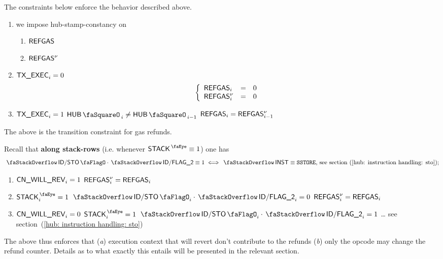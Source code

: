 The constraints below enforce the behavior described above.
\begin{enumerate}
        \item we impose hub-stamp-constancy on
		\begin{multicols}{2}
			\begin{enumerate}
				\item $\textsf{REFGAS}$
				\item $\textsf{REFGAS}^{\nu}$
			\end{enumerate}
		\end{multicols}
	\item \If $\textsf{TX}\textsf{\_EXEC}_{i} = 0$ \Then
		\[
			\left\{ \begin{array}{lcl}
				\textsf{REFGAS}_{i}     & = & 0 \\
				\textsf{REFGAS}^{\nu}_{i} & = & 0 \\
			\end{array} \right.
		\]
	\item \If $\textsf{TX}\textsf{\_EXEC}_{i} = 1$ \et $\hubStamp_{i} \neq \hubStamp_{i - 1}$ \Then $\textsf{REFGAS}_{i} = \textsf{REFGAS}^{\nu}_{i - 1}$
\end{enumerate}
The above is the transition constraint for gas refunds.

Recall that \textbf{along stack-rows} (i.e. whenever $\peekStack \equiv 1$) one has
\[
	\stackDecStoFlag \cdot \decFlag{2} \equiv 1  \iff \stackInst \equiv \inst{SSTORE} \text{, see section~(\ref{hub: instruction handling: sto});}
\]
\begin{enumerate}[resume]
	\item \If $\textsf{CN}\textsf{\_WILL\_REV}_{i} = 1$
		\Then $\textsf{REFGAS}^{\nu}_{i} = \textsf{REFGAS}_{i}$
	\item \If $\peekStack_{i} = 1$ \et $\stackDecStoFlag  _{i} \cdot \decFlag{2}_{i} = 0$
		\Then $\textsf{REFGAS}^{\nu}_{i} = \textsf{REFGAS}_{i}$
	\item \If $\textsf{CN}\textsf{\_WILL\_REV}_{i} = 0$ \et $\peekStack_{i} = 1$ \If $\stackDecStoFlag_{i} \cdot \decFlag{2}_{i}  = 1$ \Then \dots{} see section~(\ref{hub: instruction handling: sto})
\end{enumerate}
The above thus enforces that
(\emph{a}) execution context that will revert don't contribute to the refunds
(\emph{b}) only the  opcode may change the refund counter.
Details as to what exactly this entails will be presented in the relevant section.
